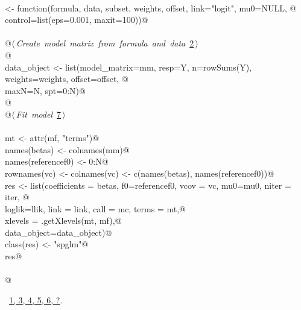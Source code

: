 \documentclass[reqno]{amsart}
\renewcommand{\NWlink}[2]{\hyperlink{#1}{#2}}
\begin{document}
\begin{flushleft}
\begin{list}{}{}
\mbox{}\verb@@\\
\mbox{}\verb@spglm <- function(formula, data, subset, weights, offset, link="logit", mu0=NULL, @\\
\mbox{}\verb@                  control=list(eps=0.001, maxit=100)){@\\
\mbox{}\verb@@\\
\mbox{}\verb@    @\hbox{$\langle\,${\itshape Create model matrix from formula and data}\nobreak\ {\footnotesize \NWlink{nuweb2}{2}}$\,\rangle$}\verb@@\\
\mbox{}\verb@    @\\
\mbox{}\verb@    data_object <- list(model_matrix=mm, resp=Y, n=rowSums(Y), weights=weights, offset=offset, @\\
\mbox{}\verb@                        maxN=N, spt=0:N)@\\
\mbox{}\verb@    @\\
\mbox{}\verb@    @\hbox{$\langle\,${\itshape Fit model}\nobreak\ {\footnotesize \NWlink{nuweb7}{7}}$\,\rangle$}\verb@@\\
\mbox{}\verb@@\\
\mbox{}\verb@    mt <- attr(mf, "terms")@\\
\mbox{}\verb@    names(betas) <- colnames(mm)@\\
\mbox{}\verb@    names(referencef0) <- 0:N@\\
\mbox{}\verb@    rownames(vc) <- colnames(vc) <- c(names(betas), names(referencef0))@\\
\mbox{}\verb@    res <- list(coefficients = betas, f0=referencef0, vcov = vc, mu0=mu0, niter = iter, @\\
\mbox{}\verb@                loglik=llik, link = link, call = mc, terms = mt,@\\
\mbox{}\verb@                xlevels = .getXlevels(mt, mf),@\\
\mbox{}\verb@                data_object=data_object)@\\
\mbox{}\verb@    class(res) <- "spglm"@\\
\mbox{}\verb@    res@\\
\mbox{}\verb@@\\
\mbox{}\verb@}@\\
\mbox{}\verb@@{\NWsep}
\end{list}
\vspace{-1.5ex}
\footnotesize
\begin{list}{}{\setlength{\itemsep}{-\parsep}\setlength{\itemindent}{-\leftmargin}}
\item \NWtxtFileDefBy\ \NWlink{nuweb1}{1}\NWlink{nuweb3}{, 3}\NWlink{nuweb4}{, 4}\NWlink{nuweb5}{, 5}\NWlink{nuweb6}{, 6}\NWlink{nuweb?}{, ?}.

\item{}
\end{list}
\vspace{4ex}
\end{flushleft}
\end{document}
